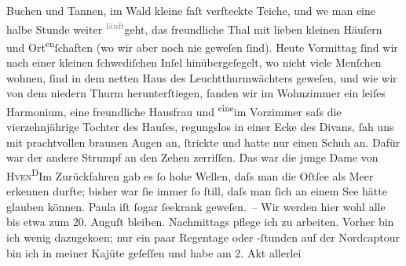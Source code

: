 \begin{ledgroupsized}[t]{13cm}
               Buchen und Tannen, im Wald kleine faſt verſteckte Teiche, und we{\geminationn} man eine halbe Stunde weiter \substVorne{}\textsuperscript{\textcolor{gray}{läuft}}\substDazwischen{}geht\substHinten{}, das freundliche Thal mit lieben kleinen Häuſern und Ort\substVorne{}\textsuperscript{en}\substDazwischen{}ſchaften\substHinten{} (wo wir aber noch nie geweſen ſind). Heute Vormittag ſind wir nach einer
               kleinen ſchwe{\pb}diſchen Inſel hinübergeſegelt, wo nicht viele
               Menſchen wohnen, ſind in dem netten Haus des Leuchtthurmwächters geweſen, und wie wir von dem niedern
               Thurm herunterſtiegen, fanden wir im Wohnzimmer ein leiſes Harmonium, eine
               freundliche Hausfrau und \substVorne{}\textsuperscript{eine}\substDazwischen{}im\substHinten{} Vorzimmer saſs die vierzehnjährige Tochter des Hauſes, regungslos in einer Ecke des Divans,
               ſah uns mit prachtvollen braunen Augen an, {\pb}ſtrickte und
               hatte nur einen Schuh an. Dafür war der andere Strumpf an den Zehen zerriſſen. Das
               war die junge Dame von \textsc{Hven}\substVorne{}\textsuperscript{D}\substDazwischen{}I\substHinten{}m Zurückfahren gab es ſo hohe Wellen, daſs man die Oſtſee als Meer erkennen durfte; bisher war ſie immer ſo
               ſtill, daſs man ſich an einem See hätte glauben können. Paula iſt ſogar ſeekrank geweſen. – Wir werden hier wohl alle
               bis etwa zum 20. Auguſt bleiben. Nachmittags pflege ich zu
               arbeiten. Vorher bin ich {\pb}wenig dazugeko{\geminationm}en; nur ein paar Regentage oder -ſtunden auf der Nordcaptour bin ich in meiner Kajüte geſeſſen
               und habe am 2. Akt allerlei

\end{ledgroupsized}
